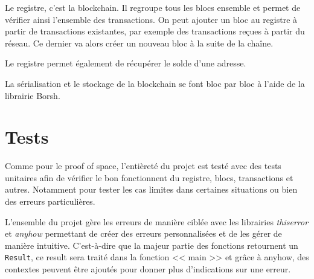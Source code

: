Le registre, c'est la blockchain. Il regroupe tous les blocs ensemble et permet de vérifier ainsi l'ensemble des transactions. On peut ajouter un bloc au registre à partir de transactions existantes, par exemple des transactions reçues à partir du réseau. Ce dernier va alors créer un nouveau bloc à la suite de la chaîne.

Le registre permet également de récupérer le solde d'une adresse.

La sérialisation et le stockage de la blockchain se font bloc par bloc à l'aide de la librairie Borsh.

\section{Tests}

Comme pour le proof of space, l'entièreté du projet est testé avec des tests unitaires afin de vérifier le bon fonctionnent du registre, blocs, transactions et autres. Notamment pour tester les cas limites dans certaines situations ou bien des erreurs particulières.

L'ensemble du projet gère les erreurs de manière ciblée avec les librairies \emph{thiserror} et \emph{anyhow} permettant de créer des erreurs personnalisées et de les gérer de manière intuitive. C'est-à-dire que la majeur partie des fonctions retournent un \verb|Result|, ce result sera traité dans la fonction << main >> et grâce à anyhow, des contextes peuvent être ajoutés pour donner plus d'indications sur une erreur.
